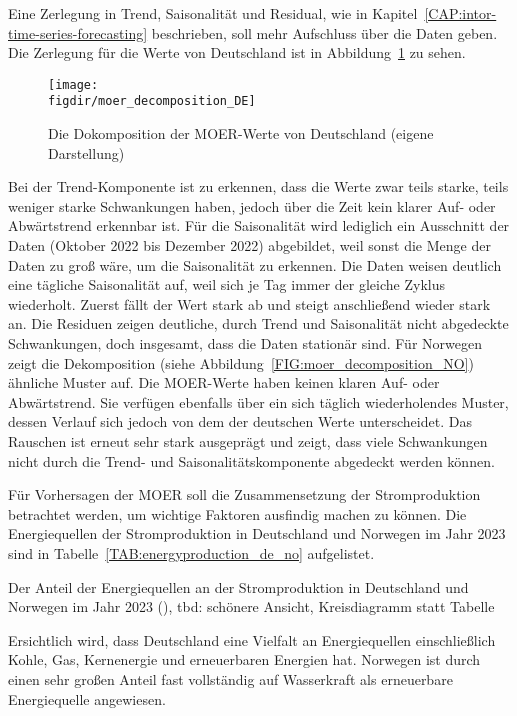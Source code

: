 Eine Zerlegung in Trend, Saisonalität und Residual, wie in Kapitel~\ref{CAP:intor-time-series-forecasting} beschrieben, soll mehr Aufschluss über die Daten geben.
Die Zerlegung für die Werte von Deutschland ist in Abbildung~\ref{FIG:moer_decomposition_DE} zu sehen.
\begin{figure}
 \caption{Die Dokomposition der MOER-Werte von Deutschland (eigene Darstellung)}
 {\texttt{[image: \\figdir/moer\_decomposition\_DE]}}
 \label{FIG:moer_decomposition_DE}
\end{figure}
Bei der Trend-Komponente ist zu erkennen, dass die Werte zwar teils starke, teils weniger starke Schwankungen haben, jedoch über die Zeit kein klarer Auf- oder Abwärtstrend erkennbar ist.
Für die Saisonalität wird lediglich ein Ausschnitt der Daten (Oktober 2022 bis Dezember 2022) abgebildet, weil sonst die Menge der Daten zu groß wäre, um die Saisonalität zu erkennen.
Die Daten weisen deutlich eine tägliche Saisonalität auf, weil sich je Tag immer der gleiche Zyklus wiederholt.
Zuerst fällt der Wert stark ab und steigt anschließend wieder stark an.
Die Residuen zeigen deutliche, durch Trend und Saisonalität nicht abgedeckte Schwankungen, doch insgesamt, dass die Daten stationär sind.
Für Norwegen zeigt die Dekomposition (siehe Abbildung~\ref{FIG:moer_decomposition_NO}) ähnliche Muster auf.
Die \ac{MOER}-Werte haben keinen klaren Auf- oder Abwärtstrend.
Sie verfügen ebenfalls über ein sich täglich wiederholendes Muster, dessen Verlauf sich jedoch von dem der deutschen Werte unterscheidet.
Das Rauschen ist erneut sehr stark ausgeprägt und zeigt, dass viele Schwankungen nicht durch die Trend- und Saisonalitätskomponente abgedeckt werden können.

Für Vorhersagen der \ac{MOER} soll die Zusammensetzung der Stromproduktion betrachtet werden, um wichtige Faktoren ausfindig machen zu können.
Die Energiequellen der Stromproduktion in Deutschland und Norwegen im Jahr 2023 sind in Tabelle~\ref{TAB:energyproduction_de_no} aufgelistet.
\begin{table}[t]
 \centering\small
 \caption{Der Anteil der Energiequellen an der Stromproduktion in Deutschland und Norwegen im Jahr 2023 (\cite{ElectricityMaps.20240305T20:54:29.000Z}), tbd: schönere Ansicht, Kreisdiagramm statt Tabelle}
 \label{TAB:energyproduction_de_no}
 
\end{table}
Ersichtlich wird, dass Deutschland eine Vielfalt an Energiequellen einschließlich Kohle, Gas, Kernenergie und erneuerbaren Energien hat.
Norwegen ist durch einen sehr großen Anteil fast vollständig auf Wasserkraft als erneuerbare Energiequelle angewiesen.

